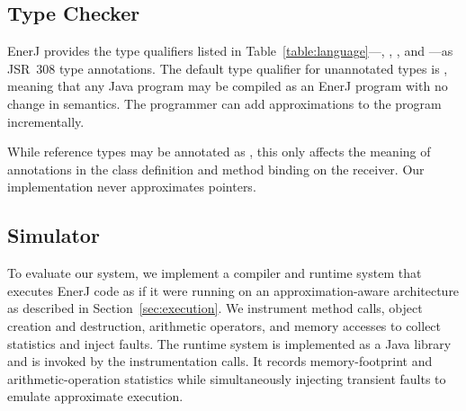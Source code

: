 \subsection{Type Checker}
\label{checker}
EnerJ provides the type qualifiers listed
in Table~\ref{table:language}---, ,
, and ---as JSR~308 type annotations.
The default type qualifier for unannotated types is , meaning
that any Java program may be compiled as an EnerJ program with no change in
semantics. The programmer can add approximations to the
program incrementally.



While reference types may be annotated as , this only affects
the meaning of  annotations in the class definition and
method binding on the receiver. Our implementation never
approximates pointers.


\subsection{Simulator}
To evaluate our system, we implement a compiler and runtime
system that executes EnerJ code as if it were running on an
approximation-aware architecture
as described in Section~\ref{sec:execution}. We instrument method calls,
object creation and destruction, arithmetic operators, and memory
accesses to collect statistics and inject faults.
The runtime system is implemented as a Java library and is invoked by the
instrumentation calls.
It records memory-footprint and arithmetic-operation statistics
while simultaneously injecting transient faults to emulate approximate
execution.

